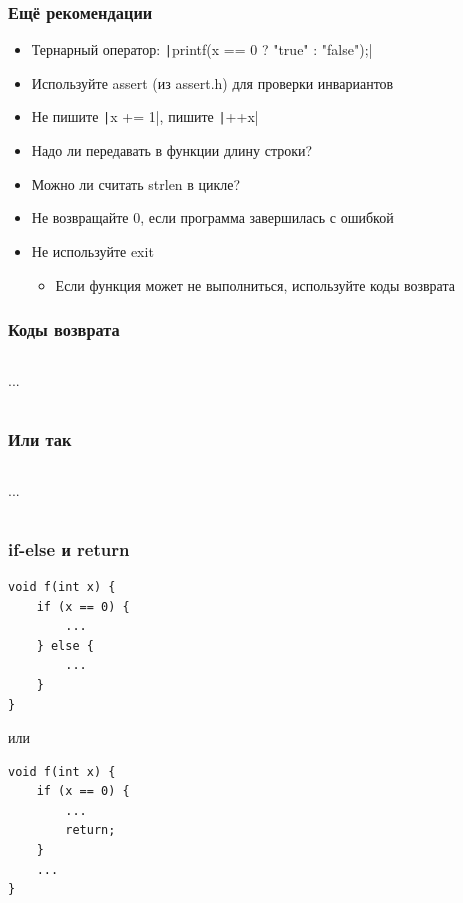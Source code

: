 \documentclass[aspectratio=169]{beamer}
\begin{document}
\begin{frame}[fragile]
    \frametitle{Ещё рекомендации}
    \begin{itemize}
        \item Тернарный оператор: \texttt|printf(x == 0 ? "true" :  "false");|
        \item Используйте assert (из assert.h) для проверки инвариантов
        \item Не пишите \texttt|x += 1|, пишите \texttt|++x|
        \item Надо ли передавать в функции длину строки?
        \item Можно ли считать strlen в цикле?
        \item Не возвращайте 0, если программа завершилась с ошибкой
        \item Не используйте exit
              \begin{itemize}
                  \item Если функция может не выполниться, используйте коды возврата
              \end{itemize}
    \end{itemize}
\end{frame}

\begin{frame}
    \frametitle{Коды возврата}
    \begin{scriptsize}
        \inputminted[firstline=2, lastline=16]{c}{fib1.c}
        ...
        \inputminted[firstline=21, lastline=26]{c}{fib1.c}
    \end{scriptsize}
\end{frame}

\begin{frame}
    \frametitle{Или так}
    \begin{scriptsize}
        \inputminted[firstline=2, lastline=13]{c}{fib2.c}
        ...
        \inputminted[firstline=17, lastline=22]{c}{fib2.c}
    \end{scriptsize}
\end{frame}

\begin{frame}[fragile]
    \frametitle{if-else и return}
    \begin{verbatim}
void f(int x) {
    if (x == 0) {
        ...
    } else {
        ...
    }
}
        \end{verbatim}
    или
    \begin{verbatim}
void f(int x) {
    if (x == 0) {
        ...
        return;
    }
    ...
}
        \end{verbatim}
\end{frame}
\end{document}
